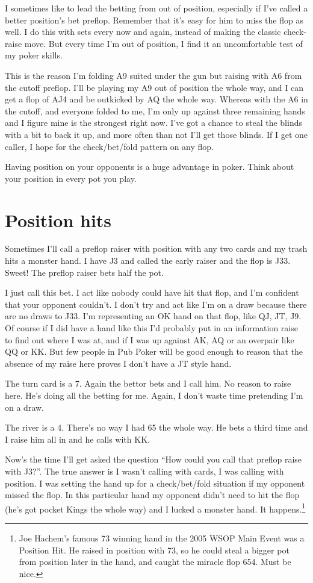I sometimes like to lead the betting from out of position, especially
if I've called a better position's bet preflop. Remember that
it's easy for him to miss the flop as well. I do this
with sets every now and again, instead of making the classic check-raise
move. But every time I'm out of position, I find it an
uncomfortable test of my poker skills.

This is the reason I'm folding A9 suited under the gun but raising
with A6 from the cutoff preflop. I'll be playing my A9 out of position the
whole way, and I can get a flop of AJ4 and be outkicked by AQ the
whole way. Whereas with the A6 in the cutoff, and everyone folded to me,
I'm only up against three remaining hands and I figure mine is
the strongest right now. I've got a chance to steal the blinds with a
bit to back it up, and more often than not I'll get those blinds. If I get
one caller, I hope for the check/bet/fold pattern on any flop.

Having position on your opponents is a huge advantage in poker. Think
about your position in every pot you play.

\section{Position hits}

Sometimes I'll call a preflop raiser with position with any two cards
and my trash hits a monster hand. I have J3 and called
the early raiser and the flop is J33. Sweet! The preflop raiser
bets half the pot.

I just call this bet. I act like nobody could have hit that flop, and
I'm confident that your opponent couldn't. I don't try and act like
I'm on a draw because there are no draws to J33. I'm representing an
OK hand on that flop, like QJ, JT, J9. Of course if I did have a hand
like this I'd probably put in an information raise to find out where
I was at, and if I was up against AK, AQ or an overpair like QQ or KK.
But few people in Pub Poker will be good enough to reason that the
absence of my raise here proves I don't have a JT style hand.

The turn card is a 7. Again the bettor bets and I call him.
No reason to raise here. He's doing all the betting for me. Again,
I don't waste time pretending I'm on a draw.

The river is a 4. There's no way I had 65 the whole way. He bets a third
time and I raise him all in and he calls with KK.

Now's the time I'll get asked the question ``How could you call that
preflop raise with J3?''. The true answer is I wasn't calling with
cards, I was calling with position. I was setting the hand up for
a check/bet/fold situation if my opponent missed the flop. In this
particular hand my opponent didn't need to hit the flop (he's got pocket
Kings the whole way) and I lucked a monster hand.
It happens.\footnote{Joe Hachem's famous 73 winning hand in the 2005
WSOP Main Event was a Position Hit. He raised in position with 73, so
he could steal a bigger pot from position later in the hand, and caught
the miracle flop 654. Must be nice.}

